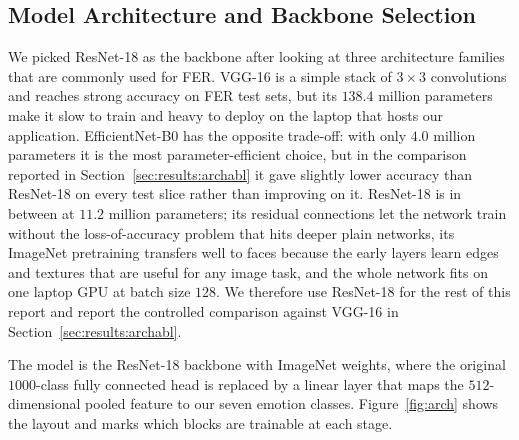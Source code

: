 \documentclass[12pt,a4paper]{article}
\begin{document}
\subsection{Model Architecture and Backbone Selection}
\label{sec:impl:arch}

We picked ResNet-18 \autocite{he2016resnet} as the backbone
after looking at three architecture families that are
commonly used for FER. VGG-16 \autocite{simonyan2015vgg} is
a simple stack of $3\times 3$ convolutions and reaches strong
accuracy on FER test sets, but its $138.4$ million parameters
make it slow to train and heavy to deploy on the laptop that
hosts our application. EfficientNet-B0
\autocite{tan2019efficientnet} has the opposite trade-off:
with only $4.0$ million parameters it is the most
parameter-efficient choice, but in the comparison reported in
Section~\ref{sec:results:archabl} it gave slightly lower
accuracy than ResNet-18 on every test slice rather than
improving on it. ResNet-18 is in between at $11.2$ million
parameters; its residual connections \autocite{he2016resnet}
let the network train without the loss-of-accuracy problem
that hits deeper plain networks, its ImageNet pretraining
transfers well to faces because the early layers learn edges
and textures that are useful for any image task, and the
whole network fits on one laptop GPU at batch size $128$. We
therefore use ResNet-18 for the rest of this report and
report the controlled comparison against VGG-16 in
Section~\ref{sec:results:archabl}.

The model is the ResNet-18 backbone with ImageNet weights,
where the original $1000$-class fully connected head is
replaced by a linear layer that maps the $512$-dimensional
pooled feature to our seven emotion classes.
Figure~\ref{fig:arch} shows the layout and marks which blocks
are trainable at each stage.
\end{document}
